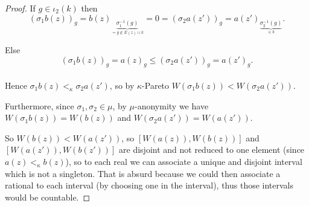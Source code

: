 \documentclass{article}
\begin{document}
\begin{proof}
  If $g\in \iota_2(k)$ then
  \[(\sigma_1 b(z))_g=b(z)_{\underset{=g \notin E(z)\cup k}
  {\underbrace{\sigma_1^{-1}(g)}}}=0=(\sigma_2 a(z'))_g=a(z')_{\underset{\in k}
  {\underbrace{\sigma_2^{-1}(g)}}}.\]

  Else
  \[(\sigma_1 b(z))_g=a(z)_g\leq (\sigma_2 a(z'))_g=a(z')_g.\] \\

  Hence $\sigma_1b(z)<_\kappa \sigma_2a(z')$, so by $\kappa$-Pareto
  $W(\sigma_1b(z))<W(\sigma_2a(z'))$.

  Furthermore, since $\sigma_1,\sigma_2\in\mu$, by $\mu$-anonymity we have
  $W(\sigma_1b(z))=W(b(z))$ and $W(\sigma_2a(z'))=W(a(z'))$.

  So $W(b(z))<W(a(z'))$, so $[W(a(z)),W(b(z))]$ and $[W(a(z')),W(b(z'))]$
  are disjoint and not reduced to one element (since $a(z)<_\kappa b(z)$), so to each real
  we can associate a unique and disjoint interval which is not a singleton. That is absurd because
  we could then associate a rational to each interval (by choosing one in the interval),
  thus those intervals would be countable.

\end{proof}





\end{document}
